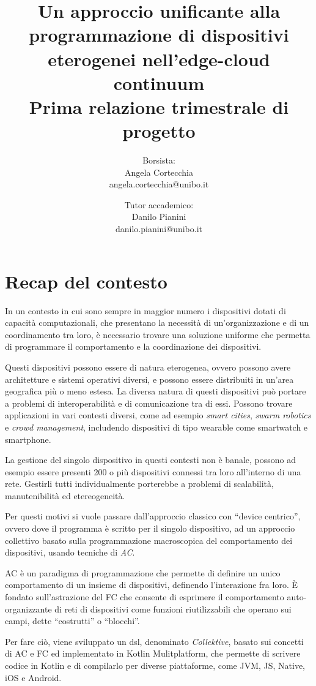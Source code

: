 \documentclass[13pt, a4paper]{article}
\title{\LARGE
    Un approccio unificante alla programmazione di dispositivi eterogenei nell'edge-cloud continuum \\ \small Prima relazione trimestrale di progetto
}
\author{
   Borsista: \\Angela Cortecchia \\ \small angela.cortecchia@unibo.it
    \and
    Tutor accademico: \\Danilo Pianini \\ \small danilo.pianini@unibo.it
}
\newcommand{\ck}{\emph{Collektive}}
\begin{document}
\maketitle
\clearpage


\section{Recap del contesto}
\label{sec:context}
In un contesto in cui sono sempre in maggior numero i dispositivi dotati di capacità computazionali,
    che presentano la necessità di un'organizzazione e di un coordinamento tra loro,
    è necessario trovare una soluzione uniforme che permetta di programmare il comportamento e la coordinazione dei dispositivi.

Questi dispositivi possono essere di natura eterogenea, ovvero possono avere architetture e sistemi operativi diversi,
    e possono essere distribuiti in un'area geografica più o meno estesa.
%
La diversa natura di questi dispositivi può portare a problemi di interoperabilità e di comunicazione tra di essi.
%
Possono trovare applicazioni in vari contesti diversi, come ad esempio \emph{smart cities}, \emph{swarm robotics} e \emph{crowd management},
    includendo dispositivi di tipo wearable come smartwatch e smartphone.

La gestione del singolo dispositivo in questi contesti non è banale, possono ad esempio essere presenti 200 o più dispositivi
    connessi tra loro all'interno di una rete.
%
Gestirli tutti individualmente porterebbe a problemi di scalabilità, manutenibilità ed etereogeneità.

Per questi motivi si vuole passare dall'approccio classico con ``device centrico'', ovvero dove il programma è scritto per il singolo dispositivo,
    ad un approccio collettivo basato sulla programmazione macroscopica del comportamento dei dispositivi,
    usando tecniche di \emph{\ac{AC}}.

\ac{AC} è un paradigma di programmazione che permette di definire un unico comportamento di un insieme di dispositivi,
    definendo l'interazione fra loro.
%
È fondato sull'astrazione del \ac{FC} che consente di esprimere il comportamento auto-organizzante di reti
    di dispositivi come funzioni riutilizzabili che operano sui campi, dette ``costrutti'' o ``blocchi''.

Per fare ciò, viene sviluppato un \ac{dsl}, denominato \ck{}, basato sui concetti di \ac{AC} e \ac{FC} ed implementato in Kotlin Mulitplatform,
    che permette di scrivere codice in Kotlin e di compilarlo per diverse piattaforme, come JVM, JS, Native, iOS e Android.
\end{document}
